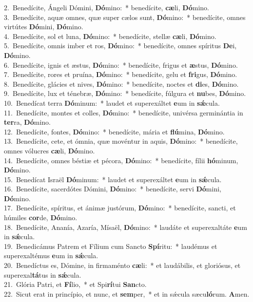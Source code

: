 {2.~}Benedícite, Ángeli Dómini, \textbf{Dó}mino:~* benedícite, \textbf{cæ}li, \textbf{Dó}mino.\\
{3.~}Benedícite, aquæ omnes, quæ super cælos sunt, \textbf{Dó}mino:~* benedícite, omnes virtútes \textbf{Dó}mini, \textbf{Dó}mino.\\
{4.~}Benedícite, sol et luna, \textbf{Dó}mino:~* benedícite, stellæ \textbf{cæ}li, \textbf{Dó}mino.\\
{5.~}Benedícite, omnis imber et ros, \textbf{Dó}mino:~* benedícite, omnes spíritus \textbf{De}i, \textbf{Dó}mino.\\
{6.~}Benedícite, ignis et æstus, \textbf{Dó}mino:~* benedícite, frigus et \textbf{æ}stus, \textbf{Dó}mino.\\
{7.~}Benedícite, rores et pruína, \textbf{Dó}mino:~* benedícite, gelu et \textbf{fri}gus, \textbf{Dó}mino.\\
{8.~}Benedícite, glácies et nives, \textbf{Dó}mino:~* benedícite, noctes et \textbf{di}es, \textbf{Dó}mino.\\
{9.~}Benedícite, lux et ténebræ, \textbf{Dó}mino:~* benedícite, fúlgura et \textbf{nu}bes, \textbf{Dó}mino.\\
{10.~}Benedícat terra \textbf{Dó}minum:~* laudet et superexáltet \textbf{e}um in \textbf{sǽ}cula.\\
{11.~}Benedícite, montes et colles, \textbf{Dó}mino:~* benedícite, univérsa germinántia in \textbf{ter}ra, \textbf{Dó}mino.\\
{12.~}Benedícite, fontes, \textbf{Dó}mino:~* benedícite, mária et \textbf{flú}mina, \textbf{Dó}mino.\\
{13.~}Benedícite, cete, et ómnia, quæ movéntur in aquis, \textbf{Dó}mino:~* benedícite, omnes vólucres \textbf{cæ}li, \textbf{Dó}mino.\\
{14.~}Benedícite, omnes béstiæ et pécora, \textbf{Dó}mino:~* benedícite, fílii \textbf{hó}minum, \textbf{Dó}mino.\\
{15.~}Benedícat Israël \textbf{Dó}minum:~* laudet et superexáltet \textbf{e}um in \textbf{sǽ}cula.\\
{16.~}Benedícite, sacerdótes Dómini, \textbf{Dó}mino:~* benedícite, servi \textbf{Dó}mini, \textbf{Dó}mino.\\
{17.~}Benedícite, spíritus, et ánimæ justórum, \textbf{Dó}mino:~* benedícite, sancti, et húmiles \textbf{cor}de, \textbf{Dó}mino.\\
{18.~}Benedícite, Ananía, Azaría, Mísaël, \textbf{Dó}mino:~* laudáte et superexaltáte \textbf{e}um in \textbf{sǽ}cula.\\
{19.~}Benedicámus Patrem et Fílium cum Sancto \textbf{Spí}ritu:~* laudémus et superexaltémus \textbf{e}um in \textbf{sǽ}cula.\\
{20.~}Benedíctus es, Dómine, in firmaménto \textbf{cæ}li:~* et laudábilis, et gloriósus, et superexal\textbf{tá}tus in \textbf{sǽ}cula.\\
{21.~}Glória Patri, et \textbf{Fí}lio,~* et Spi\textbf{rí}tui \textbf{San}cto.\\
{22.~}Sicut erat in princípio, et nunc, et \textbf{sem}per,~* et in sǽcula sæcu\textbf{ló}rum. \textbf{A}men.\\

